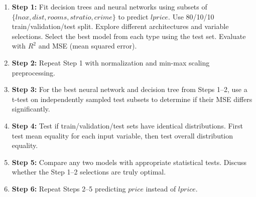 \documentclass{article}
\begin{document}
\begin{enumerate}
  
  \item \textbf{Step 1:} Fit decision trees and neural networks using subsets of $\{lnox, dist, rooms, stratio, crime\}$ to predict $lprice$. Use 80/10/10 train/validation/test split. Explore different architectures and variable selections. Select the best model from each type using the test set. Evaluate with $R^2$ and MSE (mean squared error).

  \item \textbf{Step 2:} Repeat Step 1 with normalization and min-max scaling preprocessing.

  \item \textbf{Step 3:} For the best neural network and decision tree from Steps 1--2, use a t-test on independently sampled test subsets to determine if their MSE differs significantly.

  \item \textbf{Step 4:} Test if train/validation/test sets have identical distributions. First test mean equality for each input variable, then test overall distribution equality.

  \item \textbf{Step 5:} Compare any two models with appropriate statistical tests. Discuss whether the Step 1--2 selections are truly optimal.

  \item \textbf{Step 6:} Repeat Steps 2--5 predicting $price$ instead of $lprice$.
\end{enumerate}
\end{document}
